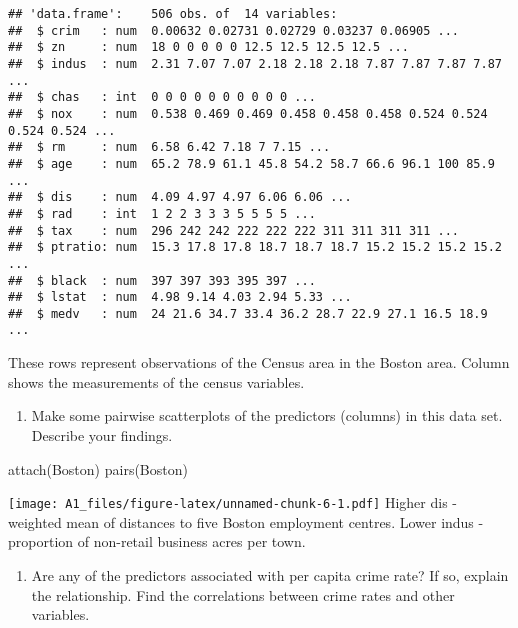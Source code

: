 \documentclass[
]{article}
\newenvironment{Shaded}{\begin{snugshade}}{\end{snugshade}}
\newcommand{\FunctionTok}[1]{\textcolor[rgb]{0.00,0.00,0.00}{#1}}
\newcommand{\NormalTok}[1]{#1}
\providecommand{\tightlist}{%
  \setlength{\itemsep}{0pt}\setlength{\parskip}{0pt}}
\begin{document}
\begin{verbatim}
## 'data.frame':    506 obs. of  14 variables:
##  $ crim   : num  0.00632 0.02731 0.02729 0.03237 0.06905 ...
##  $ zn     : num  18 0 0 0 0 0 12.5 12.5 12.5 12.5 ...
##  $ indus  : num  2.31 7.07 7.07 2.18 2.18 2.18 7.87 7.87 7.87 7.87 ...
##  $ chas   : int  0 0 0 0 0 0 0 0 0 0 ...
##  $ nox    : num  0.538 0.469 0.469 0.458 0.458 0.458 0.524 0.524 0.524 0.524 ...
##  $ rm     : num  6.58 6.42 7.18 7 7.15 ...
##  $ age    : num  65.2 78.9 61.1 45.8 54.2 58.7 66.6 96.1 100 85.9 ...
##  $ dis    : num  4.09 4.97 4.97 6.06 6.06 ...
##  $ rad    : int  1 2 2 3 3 3 5 5 5 5 ...
##  $ tax    : num  296 242 242 222 222 222 311 311 311 311 ...
##  $ ptratio: num  15.3 17.8 17.8 18.7 18.7 18.7 15.2 15.2 15.2 15.2 ...
##  $ black  : num  397 397 393 395 397 ...
##  $ lstat  : num  4.98 9.14 4.03 2.94 5.33 ...
##  $ medv   : num  24 21.6 34.7 33.4 36.2 28.7 22.9 27.1 16.5 18.9 ...
\end{verbatim}

These rows represent observations of the Census area in the Boston area.
Column shows the measurements of the census variables.

\begin{enumerate}
\def\labelenumi{(\alph{enumi})}
\setcounter{enumi}{1}
\tightlist
\item
  Make some pairwise scatterplots of the predictors (columns) in this
  data set. Describe your findings.
\end{enumerate}

\begin{Shaded}
\begin{Highlighting}[]
\FunctionTok{attach}\NormalTok{(Boston)}
\FunctionTok{pairs}\NormalTok{(Boston)}
\end{Highlighting}
\end{Shaded}

\texttt{[image: A1\_files/figure-latex/unnamed-chunk-6-1.pdf]} Higher dis
- weighted mean of distances to five Boston employment centres. Lower
indus - proportion of non-retail business acres per town.

\begin{enumerate}
\def\labelenumi{(\alph{enumi})}
\setcounter{enumi}{2}
\tightlist
\item
  Are any of the predictors associated with per capita crime rate? If
  so, explain the relationship. Find the correlations between crime
  rates and other variables.
\end{enumerate}
\end{document}
